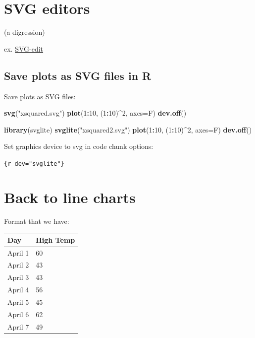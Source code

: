\documentclass[openany]{book}
\newenvironment{Shaded}{\begin{snugshade}}{\end{snugshade}}
\newcommand{\DataTypeTok}[1]{\textcolor[rgb]{0.13,0.29,0.53}{#1}}
\newcommand{\DecValTok}[1]{\textcolor[rgb]{0.00,0.00,0.81}{#1}}
\newcommand{\KeywordTok}[1]{\textcolor[rgb]{0.13,0.29,0.53}{\textbf{#1}}}
\newcommand{\NormalTok}[1]{#1}
\newcommand{\OperatorTok}[1]{\textcolor[rgb]{0.81,0.36,0.00}{\textbf{#1}}}
\newcommand{\StringTok}[1]{\textcolor[rgb]{0.31,0.60,0.02}{#1}}
\begin{document}
\hypertarget{svg-editors}{%
\section{SVG editors}\label{svg-editors}}

(a digression)

ex. \href{https://svg-edit.github.io/svgedit/releases/svg-edit-2.8.1/svg-editor.html}{SVG-edit}

\hypertarget{save-plots-as-svg-files-in-r}{%
\subsection*{Save plots as SVG files in R}\label{save-plots-as-svg-files-in-r}}

Save plots as SVG files:

\begin{Shaded}
\begin{Highlighting}[]
\KeywordTok{svg}\NormalTok{(}\StringTok{"xsquared.svg"}\NormalTok{)}
\KeywordTok{plot}\NormalTok{(}\DecValTok{1}\OperatorTok{:}\DecValTok{10}\NormalTok{, (}\DecValTok{1}\OperatorTok{:}\DecValTok{10}\NormalTok{)}\OperatorTok{^}\DecValTok{2}\NormalTok{, }\DataTypeTok{axes=}\NormalTok{F)}
\KeywordTok{dev.off}\NormalTok{()}

\KeywordTok{library}\NormalTok{(svglite)}
\KeywordTok{svglite}\NormalTok{(}\StringTok{"xsquared2.svg"}\NormalTok{)}
\KeywordTok{plot}\NormalTok{(}\DecValTok{1}\OperatorTok{:}\DecValTok{10}\NormalTok{, (}\DecValTok{1}\OperatorTok{:}\DecValTok{10}\NormalTok{)}\OperatorTok{^}\DecValTok{2}\NormalTok{, }\DataTypeTok{axes=}\NormalTok{F)}
\KeywordTok{dev.off}\NormalTok{()}
\end{Highlighting}
\end{Shaded}

Set graphics device to svg in code
chunk options:

\texttt{\{r\ dev="svglite"\}}

\hypertarget{back-to-line-charts}{%
\section{Back to line charts}\label{back-to-line-charts}}

Format that we have:

\begin{longtable}[]{@{}ll@{}}
\toprule
Day & High Temp\tabularnewline
\midrule
\endhead
April 1 & 60\tabularnewline
April 2 & 43\tabularnewline
April 3 & 43\tabularnewline
April 4 & 56\tabularnewline
April 5 & 45\tabularnewline
April 6 & 62\tabularnewline
April 7 & 49\tabularnewline
\bottomrule
\end{longtable}
\end{document}
